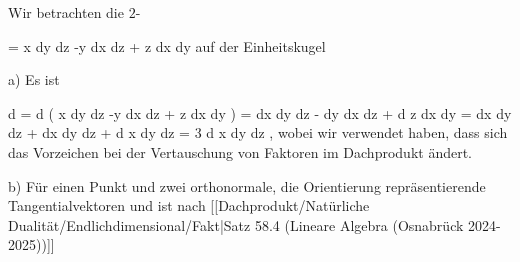 {

Wir betrachten die
$2$-

\mavergleichskettedisp
{\vergleichskette
{ \omega
}
{ =} { x dy \wedge dz -y dx \wedge dz + z dx \wedge dy
}
{ } {
}
{ } {
}
{ } {
}
}
{}{}{}
auf der Einheitskugel

}
{

a) Es ist

\mavergleichskettealign
{\vergleichskettealign
{d \omega
}
{ =} { d \left(  x dy \wedge dz  -y dx \wedge dz +  z dx \wedge dy \right)
}
{ =} { dx \wedge dy \wedge dz - dy \wedge dx \wedge dz + d z \wedge dx \wedge dy
}
{ =} { dx \wedge dy \wedge dz + dx \wedge dy \wedge dz + d x \wedge dy \wedge dz
}
{ =} { 3 d x \wedge dy \wedge dz
}
}
{}
{}{,}
wobei wir verwendet haben, dass sich das Vorzeichen bei der Vertauschung von Faktoren im Dachprodukt ändert.

b) Für einen Punkt
 und zwei orthonormale,
 {} {}
die Orientierung repräsentierende Tangentialvektoren
 und
 ist nach
[[Dachprodukt/Natürliche Dualität/Endlichdimensional/Fakt|Satz 58.4 (Lineare Algebra (Osnabrück 2024-2025))]]

}
